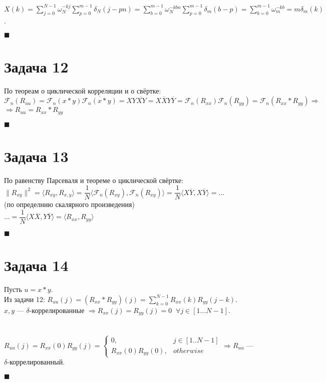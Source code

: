 \documentclass{article}
\newcommand\proofend{\begin{flushright}$\blacksquare$\end{flushright}}
\begin{document}
{	$X(k) = \sum\limits_{j = 0}^{N - 1} \omega_N^{-kj} \sum\limits_{p=0}^{m-1}\delta_N(j - pn) = \sum\limits_{b=0}^{m-1} \omega_N^{-kbn} \sum\limits_{p=0}^{m-1}\delta_m(b - p) = \sum\limits_{b=0}^{m-1} \omega_m^{-kb} = m\delta_m(k)$.
	\proofend
	\pagebreak

	\section*{Задача 12}
	По теореам о циклической корреляции и о свёртке:\\
	$\mathcal{F}_n(R_{uu}) = \mathcal{F}_n ( x \ast y ) \overline{\mathcal{F}_n(x \ast y)} = XY\overline{XY} = X\overline{X}Y\overline{Y} = \mathcal{F}_n(R_{xx})\mathcal{F}_n(R_{yy}) = \mathcal{F}_n(R_{xx} \ast R_{yy}) \Rightarrow$ \\
	$\Rightarrow R_{uu} = R_{xx} \ast R_{yy}$
	\proofend

	\section*{Задача 13}
	По равенству Парсеваля и теореме о циклической свёртке:\\
	$\| R_{xy} \|^2 = \langle R_{xy}, R_{x,y}\rangle  = \dfrac{1}{N} \langle \mathcal{F}_n(R_{xy}), \mathcal{F}_n(R_{xy})\rangle  = \dfrac{1}{N} \langle X\overline{Y}, X\overline{Y}\rangle  = ...$ \\(по определнию скалярного произведения)\\$... = \dfrac{1}{N} \langle X\overline{X}, Y\overline{Y}\rangle  = \langle R_{xx}, R_{yy}\rangle $
	\proofend

	\section*{Задача 14}
	Пусть $u = x \ast y$.\\
	Из задачи 12: $R_{uu}(j) = (R_{xx} \ast R_{yy})(j) = \sum\limits_{k = 0}^{N - 1} R_{xx}(k) R_{yy}(j - k).$\\
	$x, y$ --- $\delta$-коррелированные $\Rightarrow R_{xx}(j) = R_{yy}(j) = 0 \;\;\forall j \in [1 ... N - 1]$.\\ \\ \\
	$R_{uu}(j) = R_{xx}(0) R_{yy}(j) = \left\{\begin{matrix}
		0, & j \in [1..N-1] \\
		R_{xx}(0)R_{yy}(0), & otherwise

	\end{matrix}\right. \Rightarrow R_{uu} $ --- $\delta$-коррелированный.
	\proofend

}
\end{document}
